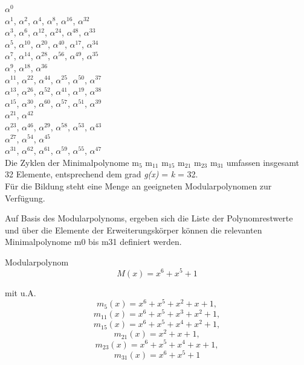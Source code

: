 \documentclass[11pt,a4paper]{article}
\begin{document}
$\alpha$$^{0}$ \\
$\alpha$$^{1}$, $\alpha$$^{2}$, $\alpha$$^{4}$, $\alpha$$^{8}$, $\alpha$$^{16}$, $\alpha$$^{32}$ \\
$\alpha$$^{3}$, $\alpha$$^{6}$, $\alpha$$^{12}$, $\alpha$$^{24}$, $\alpha$$^{48}$, $\alpha$$^{33}$ \\
$\alpha$$^{5}$, $\alpha$$^{10}$, $\alpha$$^{20}$, $\alpha$$^{40}$, $\alpha$$^{17}$, $\alpha$$^{34}$ \\
$\alpha$$^{7}$, $\alpha$$^{14}$, $\alpha$$^{28}$, $\alpha$$^{56}$, $\alpha$$^{49}$, $\alpha$$^{35}$ \\
$\alpha$$^{9}$, $\alpha$$^{18}$, $\alpha$$^{36}$ \\ $\alpha$$^{11}$, $\alpha$$^{22}$, $\alpha$$^{44}$,
$\alpha$$^{25}$, $\alpha$$^{50}$, $\alpha$$^{37}$ \\
$\alpha$$^{13}$, $\alpha$$^{26}$, $\alpha$$^{52}$, $\alpha$$^{41}$, $\alpha$$^{19}$, $\alpha$$^{38}$ \\
$\alpha$$^{15}$, $\alpha$$^{30}$, $\alpha$$^{60}$, $\alpha$$^{57}$, $\alpha$$^{51}$, $\alpha$$^{39}$ \\
$\alpha$$^{21}$, $\alpha$$^{42}$ \\
$\alpha$$^{23}$, $\alpha$$^{46}$, $\alpha$$^{29}$, $\alpha$$^{58}$, $\alpha$$^{53}$, $\alpha$$^{43}$ \\
$\alpha$$^{27}$, $\alpha$$^{54}$, $\alpha$$^{45}$ \\
$\alpha$$^{31}$, $\alpha$$^{62}$, $\alpha$$^{61}$, $\alpha$$^{59}$, $\alpha$$^{55}$, $\alpha$$^{47}$ \\

Die Zyklen der Minimalpolynome m$_{5}$ m$_{11}$ m$_{15}$ m$_{21}$ m$_{23}$ m$_{31}$ umfassen insgesamt 32 Elemente, entsprechend dem grad \textit{g(x)} = \textit{k} = 32. \\

Für die Bildung steht eine Menge an geeigneten Modularpolynomen zur Verfügung.

Auf Basis des Modularpolynoms, ergeben sich die Liste der Polynomrestwerte und über die Elemente der Erweiterungskörper können die relevanten  Minimalpolynome m0 bis m31 definiert werden.

Modularpolynom
\[M(x) = x^{6}+x^{5}+1 \]

mit u.A. \[m_{5}(x) = x^{6} + x^{5} + x^{2} + x + 1 , \]
	\[m_{11}(x) = x^{6} + x^{5} + x^{3} + x^{2} + 1 ,\]	
	\[m_{15}(x) = x^{6} + x^{5} + x^{4} + x^{2} + 1 ,\]	
	\[m_{21}(x) = x^{2} + x + 1 ,\]
	\[m_{23}(x) = x^{6} + x^{5} + x^{4} + x + 1 ,\]
	\[m_{31}(x) = x^{6} + x^{5} + 1 \]
	
\end{document}
